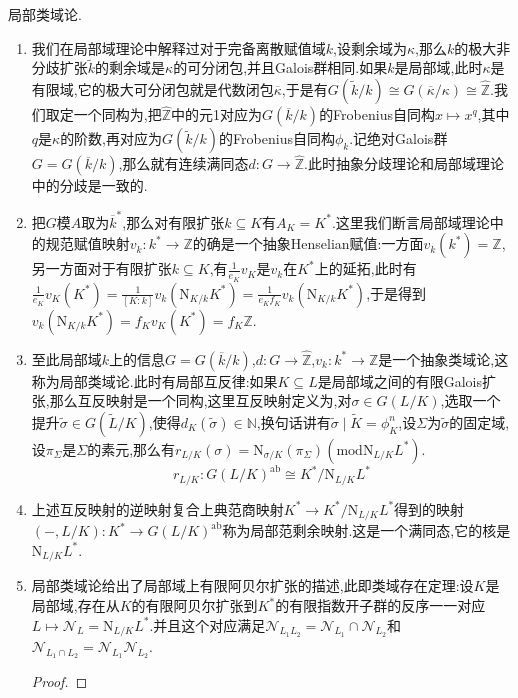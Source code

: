 局部类域论.
\begin{enumerate}
	\item 我们在局部域理论中解释过对于完备离散赋值域$k$,设剩余域为$\kappa$,那么$k$的极大非分歧扩张$\widetilde{k}$的剩余域是$\kappa$的可分闭包,并且Galois群相同.如果$k$是局部域,此时$\kappa$是有限域,它的极大可分闭包就是代数闭包$\overline{\kappa}$,于是有$G(\widetilde{k}/k)\cong G(\overline{\kappa}/\kappa)\cong\widehat{\mathbb{Z}}$.我们取定一个同构为,把$\widehat{\mathbb{Z}}$中的元1对应为$G(\overline{k}/k)$的Frobenius自同构$x\mapsto x^q$,其中$q$是$\kappa$的阶数,再对应为$G(\widetilde{k}/k)$的Frobenius自同构$\phi_k$.记绝对Galois群$G=G(\overline{k}/k)$,那么就有连续满同态$d:G\to\widehat{\mathbb{Z}}$.此时抽象分歧理论和局部域理论中的分歧是一致的.
	\item 把$G$模$A$取为$\overline{k}^*$,那么对有限扩张$k\subseteq K$有$A_K=K^*$.这里我们断言局部域理论中的规范赋值映射$v_k:k^*\to\mathbb{Z}$的确是一个抽象Henselian赋值:一方面$v_k(k^*)=\mathbb{Z}$,另一方面对于有限扩张$k\subseteq K$,有$\frac{1}{e_K}v_K$是$v_k$在$K^*$上的延拓,此时有$\frac{1}{e_K}v_K(K^*)=\frac{1}{[K:k]}v_k(\mathrm{N}_{K/k}K^*)=\frac{1}{e_Kf_K}v_k(\mathrm{N}_{K/k}K^*)$,于是得到$v_k(\mathrm{N}_{K/k}K^*)=f_Kv_K(K^*)=f_K\mathbb{Z}$.
	\item 至此局部域$k$上的信息$G=G(\overline{k}/k)$,$d:G\to\widehat{\mathbb{Z}}$,$v_k:k^*\to\mathbb{Z}$是一个抽象类域论,这称为局部类域论.此时有局部互反律:如果$K\subseteq L$是局部域之间的有限Galois扩张,那么互反映射是一个同构,这里互反映射定义为,对$\sigma\in G(L/K)$,选取一个提升$\widetilde{\sigma}\in G(\widetilde{L}/K)$,使得$d_K(\widetilde{\sigma})\in\mathbb{N}$,换句话讲有$\widetilde{\sigma}\mid\widetilde{K}=\phi_K^n$,设$\Sigma$为$\widetilde{\sigma}$的固定域,设$\pi_{\Sigma}$是$\Sigma$的素元,那么有$r_{L/K}(\sigma)=\mathrm{N}_{\sigma/K}(\pi_{\Sigma})(\mathrm{mod}\mathrm{N}_{L/K}L^*)$.
	$$r_{L/K}:G(L/K)^{\mathrm{ab}}\cong K^*/\mathrm{N}_{L/K}L^*$$
	\item 上述互反映射的逆映射复合上典范商映射$K^*\to K^*/\mathrm{N}_{L/K}L^*$得到的映射$(-,L/K):K^*\to G(L/K)^{\mathrm{ab}}$称为局部范剩余映射.这是一个满同态,它的核是$\mathrm{N}_{L/K}L^*$.
	\item 局部类域论给出了局部域上有限阿贝尔扩张的描述,此即类域存在定理:设$K$是局部域,存在从$K$的有限阿贝尔扩张到$K^*$的有限指数开子群的反序一一对应$L\mapsto\mathscr{N}_L=\mathrm{N}_{L/K}L^*$.并且这个对应满足$\mathscr{N}_{L_1L_2}=\mathscr{N}_{L_1}\cap\mathscr{N}_{L_2}$和$\mathscr{N}_{L_1\cap L_2}=\mathscr{N}_{L_1}\mathscr{N}_{L_2}$.
	\begin{proof}
		

\end{proof}
\end{enumerate}
